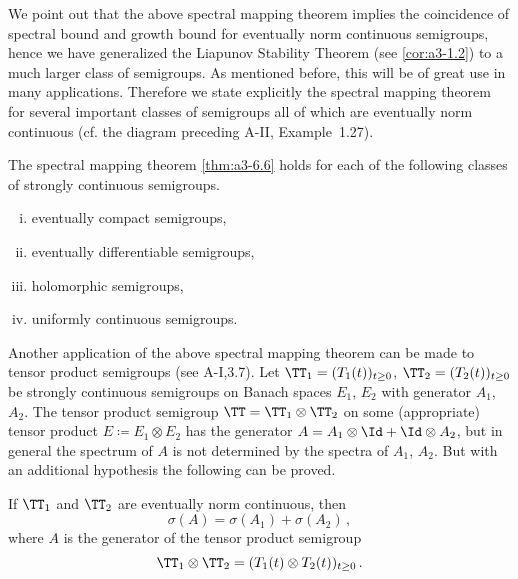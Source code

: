 We point out that the above spectral mapping theorem implies the coincidence of spectral bound and growth bound for eventually norm continuous semigroups, hence we have generalized the Liapunov Stability Theorem (see \ref{cor:a3-1.2}) to a much larger class of semigroups.
As mentioned before, this will be of great use in many applications.
Therefore we state explicitly the spectral mapping theorem for several important classes of semigroups all of which are eventually norm continuous (cf. the diagram preceding A-II, Example~1.27).
\begin{corollary}\label{cor:a3-6.7}
The spectral mapping theorem \ref{thm:a3-6.6}
holds for each of the following classes of strongly continuous semigroups.
\begin{enumerate}[(i)]
\item 
eventually compact semigroups,

\item 
eventually differentiable semigroups,

\item 
holomorphic semigroups,

\item 
uniformly continuous semigroups.
\end{enumerate}
\end{corollary}
Another application of the above spectral mapping theorem can be made to tensor product semigroups (see A-I,3.7).
Let $\TT_{1} = (T_{1}(t))_{t\geq 0}$, $\TT_{2} = (T_{2}(t))_{t\geq 0}$ be strongly continuous semigroups on Banach spaces $E_{1}$, $E_{2}$ with generator $A_{1}$, $A_{2}$.
The tensor product semigroup $\TT = \TT_{1} \otimes \TT_{2}$ on some (appropriate) tensor product $E \coloneqq E_{1} \otimes E_{2}$ has the generator $A = A_{1}\otimes\Id + \Id\otimes A_{2}$, but in general the spectrum of $A$ is not determined by the spectra of $A_{1}$, $A_{2}$.
But with an additional hypothesis the following can be proved.
\begin{corollary}\label{cor:a3-6.8}
If $\TT_{1}$ and $\TT_{2}$ are eventually norm continuous, then
\[
	\sigma(A) = \sigma(A_{1}) + \sigma(A_{2})\,,
\]
where $A$ is the generator of the tensor product semigroup
\[
	\TT_{1} \otimes \TT_{2} = (T_{1}(t) \otimes T_{2}(t))_{t\geq 0}\,.
\]
\end{corollary}
